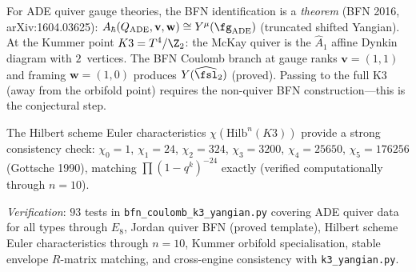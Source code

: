 \begin{remark}
\label{rem:bfn-ade-proved}
For ADE quiver gauge theories, the BFN identification is a
\emph{theorem} (BFN 2016, arXiv:1604.03625):
$A_\hbar(Q_{\mathrm{ADE}}, \mathbf{v}, \mathbf{w}) \cong
Y^{\mu}(\fg_{\mathrm{ADE}})$ (truncated shifted Yangian).
At the Kummer point $K3 = T^4/\Z_2$: the McKay quiver is the
$\widehat{A}_1$ affine Dynkin diagram with $2$~vertices.  The
BFN Coulomb branch at gauge ranks $\mathbf{v} = (1, 1)$ and
framing $\mathbf{w} = (1, 0)$ produces $Y(\widehat{\fsl}_2)$
(proved).  Passing to the full K3 (away from the orbifold point)
requires the non-quiver BFN construction---this is the conjectural
step.

The Hilbert scheme Euler characteristics $\chi(\mathrm{Hilb}^n(K3))$
provide a strong consistency check: $\chi_0 = 1$, $\chi_1 = 24$,
$\chi_2 = 324$, $\chi_3 = 3200$, $\chi_4 = 25650$, $\chi_5 = 176256$
(Gottsche 1990), matching $\prod(1 - q^k)^{-24}$ exactly (verified
computationally through $n = 10$).

\noindent\textit{Verification}: $93$ tests in
\texttt{bfn\_coulomb\_k3\_yangian.py} covering ADE quiver data for
all types through $E_8$, Jordan quiver BFN (proved template),
Hilbert scheme Euler characteristics through $n = 10$,
Kummer orbifold specialisation, stable envelope $R$-matrix
matching, and cross-engine consistency with \texttt{k3\_yangian.py}.
\end{remark}
